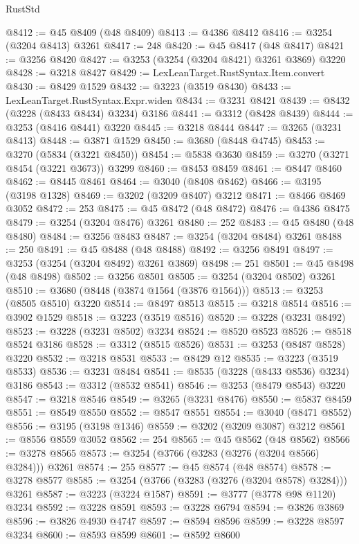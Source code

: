 \begin{lexlean}{RustStd}
\begin{coremodule}
{\begin{coremodule}
{{{{{{{{{{{{{{{{{{{{{{{{{{{{{{{{{{{{{@8412 := @45 @8409 (@48 @8409)
@8413 := @4386 @8412
@8416 := @3254 (@3204 @8413) @3261
@8417 := 248
@8420 := @45 @8417 (@48 @8417)
@8421 := @3256 @8420
@8427 := @3253 (@3254 (@3204 @8421) @3261 @3869) @3220
@8428 := @3218 @8427
@8429 := LexLeanTarget.RustSyntax.Item.convert
@8430 := @8429 @1529
@8432 := @3223 (@3519 @8430)
@8433 := LexLeanTarget.RustSyntax.Expr.widen
@8434 := @3231 @8421
@8439 := @8432 (@3228 (@8433 @8434) @3234) @3186
@8441 := @3312 (@8428 @8439)
@8444 := @3253 (@8416 @8441) @3220
@8445 := @3218 @8444
@8447 := @3265 (@3231 @8413)
@8448 := @3871 @1529
@8450 := @3680 (@8448 @4745)
@8453 := @3270 (@5834 (@3221 @8450))
@8454 := @5838 @3630
@8459 := @3270 (@3271 @8454 (@3221 @3673)) @3299
@8460 := @8453 @8459
@8461 := @8447 @8460
@8462 := @8445 @8461
@8464 := @3040 (@8408 @8462)
@8466 := @3195 (@3198 @1328)
@8469 := @3202 (@3209 @8407) @3212
@8471 := @8466 @8469 @3052
@8472 := 253
@8475 := @45 @8472 (@48 @8472)
@8476 := @4386 @8475
@8479 := @3254 (@3204 @8476) @3261
@8480 := 252
@8483 := @45 @8480 (@48 @8480)
@8484 := @3256 @8483
@8487 := @3254 (@3204 @8484) @3261
@8488 := 250
@8491 := @45 @8488 (@48 @8488)
@8492 := @3256 @8491
@8497 := @3253 (@3254 (@3204 @8492) @3261 @3869)
@8498 := 251
@8501 := @45 @8498 (@48 @8498)
@8502 := @3256 @8501
@8505 := @3254 (@3204 @8502) @3261
@8510 := @3680 (@8448 (@3874 @1564 (@3876 @1564)))
@8513 := @3253 (@8505 @8510) @3220
@8514 := @8497 @8513
@8515 := @3218 @8514
@8516 := @3902 @1529
@8518 := @3223 (@3519 @8516)
@8520 := @3228 (@3231 @8492)
@8523 := @3228 (@3231 @8502) @3234
@8524 := @8520 @8523
@8526 := @8518 @8524 @3186
@8528 := @3312 (@8515 @8526)
@8531 := @3253 (@8487 @8528) @3220
@8532 := @3218 @8531
@8533 := @8429 @12
@8535 := @3223 (@3519 @8533)
@8536 := @3231 @8484
@8541 := @8535 (@3228 (@8433 @8536) @3234) @3186
@8543 := @3312 (@8532 @8541)
@8546 := @3253 (@8479 @8543) @3220
@8547 := @3218 @8546
@8549 := @3265 (@3231 @8476)
@8550 := @5837 @8459
@8551 := @8549 @8550
@8552 := @8547 @8551
@8554 := @3040 (@8471 @8552)
@8556 := @3195 (@3198 @1346)
@8559 := @3202 (@3209 @3087) @3212
@8561 := @8556 @8559 @3052
@8562 := 254
@8565 := @45 @8562 (@48 @8562)
@8566 := @3278 @8565
@8573 := @3254 (@3766 (@3283 (@3276 (@3204 @8566) @3284))) @3261
@8574 := 255
@8577 := @45 @8574 (@48 @8574)
@8578 := @3278 @8577
@8585 := @3254 (@3766 (@3283 (@3276 (@3204 @8578) @3284))) @3261
@8587 := @3223 (@3224 @1587)
@8591 := @3777 (@3778 @98 @1120) @3234
@8592 := @3228 @8591
@8593 := @3228 @6794
@8594 := @3826 @3869
@8596 := @3826 @4930 @4747
@8597 := @8594 @8596
@8599 := @3228 @8597 @3234
@8600 := @8593 @8599
@8601 := @8592 @8600
}}}}}}}}}}}}}}}}}}}}}}}}}}}}}}}}}}}}}
\end{coremodule}}
\end{coremodule}
\end{lexlean}
